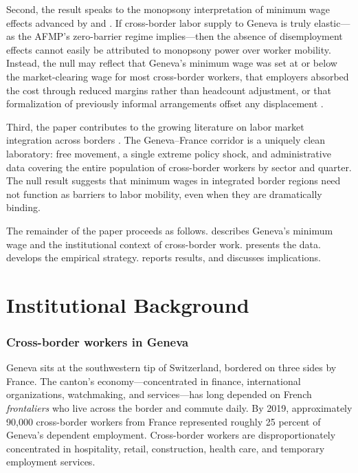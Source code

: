 \documentclass[12pt]{article}
\begin{document}
Second, the result speaks to the monopsony interpretation of minimum wage effects advanced by \citet{manning2003} and \citet{azar2022}. If cross-border labor supply to Geneva is truly elastic---as the AFMP's zero-barrier regime implies---then the absence of disemployment effects cannot easily be attributed to monopsony power over worker mobility. Instead, the null may reflect that Geneva's minimum wage was set at or below the market-clearing wage for most cross-border workers, that employers absorbed the cost through reduced margins rather than headcount adjustment, or that formalization of previously informal arrangements offset any displacement \citep{meghir2012}.

Third, the paper contributes to the growing literature on labor market integration across borders \citep{dustmann2005, borjas2017, peri2012}. The Geneva--France corridor is a uniquely clean laboratory: free movement, a single extreme policy shock, and administrative data covering the entire population of cross-border workers by sector and quarter. The null result suggests that minimum wages in integrated border regions need not function as barriers to labor mobility, even when they are dramatically binding.

The remainder of the paper proceeds as follows.  describes Geneva's minimum wage and the institutional context of cross-border work.  presents the data.  develops the empirical strategy.  reports results, and  discusses implications.


\section{Institutional Background}
\label{sec:background}

\subsubsection*{Cross-border workers in Geneva} Geneva sits at the southwestern tip of Switzerland, bordered on three sides by France. The canton's economy---concentrated in finance, international organizations, watchmaking, and services---has long depended on French \textit{frontaliers} who live across the border and commute daily. By 2019, approximately 90,000 cross-border workers from France represented roughly 25 percent of Geneva's dependent employment. Cross-border workers are disproportionately concentrated in hospitality, retail, construction, health care, and temporary employment services.
\end{document}
